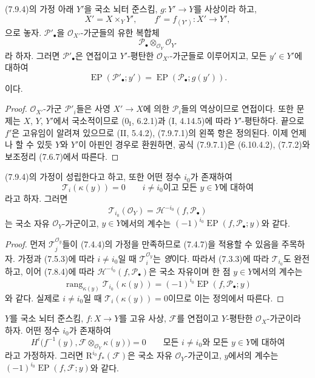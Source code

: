 \begin{proposition}[7.9.7]
\label{III.7.9.7.fr}
(7.9.4)의 가정 아래 $Y'$을 국소 뇌터 준스킴, $g:Y'\to Y$를 사상이라
하고,
\[
  X'=X\times_Y Y',
  \qquad f'=f_{(Y')}:X'\longrightarrow Y',
\]
으로 놓자. $\mathscr P'_\bullet$을 $\mathscr O_{X'}$-가군들의 유한
복합체
\[
  \mathscr P_\bullet\otimes_{\mathscr O_Y}\mathscr O_{Y'}
\]
라 하자. 그러면 $\mathscr P'_\bullet$은 연접이고 $Y'$-평탄한
$\mathscr O_{X'}$-가군들로 이루어지고, 모든 $y'\in Y'$에 대하여
\[
  \operatorname{EP}(\mathscr P'_\bullet;y')
  =\operatorname{EP}(\mathscr P_\bullet;g(y')).
  \tag{7.9.7.1}\label{III.7.9.7.1.fr}
\]
이다.
\end{proposition}

\begin{proof}
$\mathscr O_{X'}$-가군 $\mathscr P'_i$들은 사영 $X'\to X$에 의한
$\mathscr P_i$들의 역상이므로 연접이다. 또한 문제는 $X$, $Y$, $Y'$에서
국소적이므로 ($0_{\mathrm I}$, 6.2.1)과 (I, 4.14.5)에 따라
$Y'$-평탄하다. 끝으로 $f'$은 고유임이 알려져 있으므로 (II, 5.4.2),
(7.9.7.1)의 왼쪽 항은 정의된다. 이제 언제나 할 수 있듯 $Y$와 $Y'$이
아핀인 경우로 환원하면, 공식 (7.9.7.1)은 (6.10.4.2), (7.7.2)와 보조정리
(7.6.7)에서 따른다.
\end{proof}
\begin{proposition}[7.9.8]
\label{III.7.9.8.fr}
(7.9.4)의 가정이 성립한다고 하고, 또한 어떤 정수 $i_0$가 존재하여
\[
  \mathscr T_i(\kappa(y))=0
  \qquad\text{$i\ne i_0$이고 모든 $y\in Y$에 대하여}
\]
라고 하자. 그러면
\[
  \mathscr T_{i_0}(\mathscr O_Y)
  =\mathscr H^{-i_0}(f,\mathscr P_\bullet)
\]
는 국소 자유 $\mathscr O_Y$-가군이고, $y\in Y$에서의 계수는
$(-1)^{i_0}\operatorname{EP}(f,\mathscr P_\bullet;y)$와 같다.
\end{proposition}

\begin{proof}
먼저 $\mathscr T_j^{\mathscr O_y}$들이 (7.4.4)의 가정을 만족하므로
(7.4.7)을 적용할 수 있음을 주목하자. 가정과 (7.5.3)에 따라
$i\ne i_0$일 때 $\mathscr T_i^{\mathscr O_y}$는 \emph{영}이다. 따라서
(7.3.3)에 따라 $\mathscr T_{i_0}$도 완전하고, 이어 (7.8.4)에 따라
$\mathscr H^{-i_0}(f,\mathscr P_\bullet)$은 국소 자유이며 한 점
$y\in Y$에서의 계수는
\[
  \operatorname{rang}_{\kappa(y)}
  \mathscr T_{i_0}(\kappa(y))
  =(-1)^{i_0}\operatorname{EP}(f,\mathscr P_\bullet;y)
\]
와 같다. 실제로 $i\ne i_0$일 때 $\mathscr T_i(\kappa(y))=0$이므로 이는
정의에서 따른다.
\end{proof}

\begin{corollary}[7.9.9]
\label{III.7.9.9.fr}
$Y$를 국소 뇌터 준스킴, $f:X\to Y$를 고유 사상, $\mathscr F$를
연접이고 $Y$-평탄한 $\mathscr O_X$-가군이라 하자. 어떤 정수 $i_0$가
존재하여
\[
  H^i\bigl(f^{-1}(y),
  \mathscr F\otimes_{\mathscr O_Y}\kappa(y)\bigr)=0
  \qquad\text{모든 $i\ne i_0$와 모든 $y\in Y$에 대하여}
\]
라고 가정하자. 그러면 $\mathrm R^{i_0}f_*(\mathscr F)$은 국소 자유
$\mathscr O_Y$-가군이고, $y$에서의 계수는
$(-1)^{i_0}\operatorname{EP}(f,\mathscr F;y)$와 같다.
\end{corollary}

